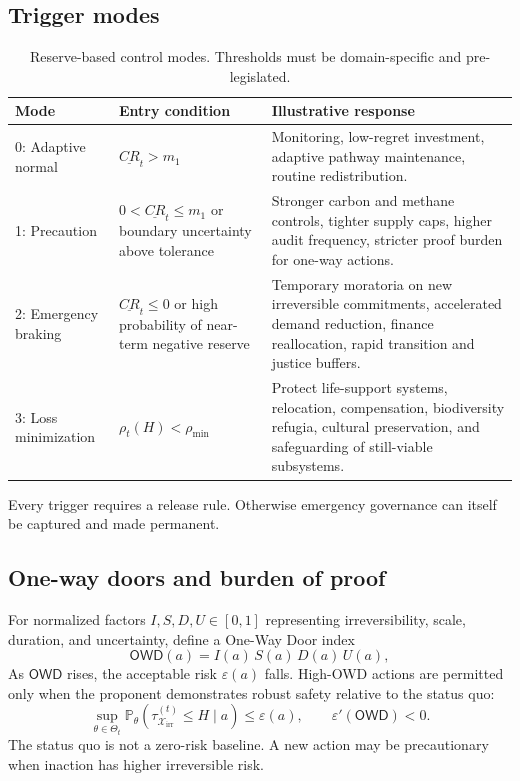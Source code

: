 \documentclass[11pt,a4paper]{article}
\numberwithin{equation}{section}
\theoremstyle{definition}
\theoremstyle{plain}
\theoremstyle{remark}
\newcommand{\Pp}{\mathbb{P}}
\newcommand{\irrev}{\mathcal{X}_{\mathrm{irr}}}
\begin{document}
\subsection{Trigger modes}

\begin{table}[H]
\centering
\caption{Reserve-based control modes. Thresholds must be domain-specific and pre-legislated.}
\label{tab:modes}
\begin{tabularx}{\textwidth}{@{}L{0.16\textwidth}L{0.26\textwidth}Y@{}}
\toprule
\textbf{Mode} & \textbf{Entry condition} & \textbf{Illustrative response} \\
: Adaptive normal & $\underline{CR}_t>m_1$ & Monitoring, low-regret investment, adaptive pathway maintenance, routine redistribution. \\
1: Precaution & $0<\underline{CR}_t\le m_1$ or boundary uncertainty above tolerance & Stronger carbon and methane controls, tighter supply caps, higher audit frequency, stricter proof burden for one-way actions. \\
2: Emergency braking & $\underline{CR}_t\le0$ or high probability of near-term negative reserve & Temporary moratoria on new irreversible commitments, accelerated demand reduction, finance reallocation, rapid transition and justice buffers. \\
3: Loss minimization & $\rho_t(H)<\rho_{\min}$ & Protect life-support systems, relocation, compensation, biodiversity refugia, cultural preservation, and safeguarding of still-viable subsystems. \\
\bottomrule
\end{tabularx}
\end{table}

Every trigger requires a release rule. Otherwise emergency governance can itself be captured and made permanent.

\subsection{One-way doors and burden of proof}

For normalized factors $I,S,D,U\in[0,1]$ representing irreversibility, scale, duration, and uncertainty, define a One-Way Door index
\begin{equation}
\mathsf{OWD}(a)=
I(a)\,S(a)\,D(a)\,U(a),
\label{eq:owd}
\end{equation}
As $\mathsf{OWD}$ rises, the acceptable risk $\varepsilon(a)$ falls. High-OWD actions are permitted only when the proponent demonstrates robust safety relative to the status quo:
\begin{equation}
\sup_{\theta\in\Theta_t}
\Pp_{\theta}(\tau_{\irrev}^{(t)}\le H\mid a)
\le\varepsilon(a),
\qquad
\varepsilon'(\mathsf{OWD})<0.
\label{eq:burdenproof}
\end{equation}
The status quo is not a zero-risk baseline. A new action may be precautionary when inaction has higher irreversible risk.
\end{document}
